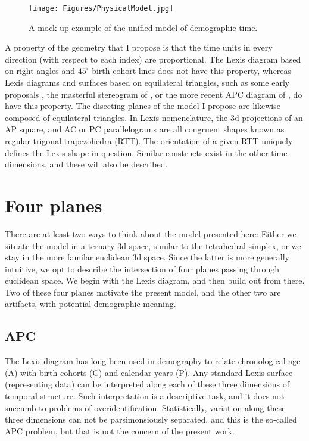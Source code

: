 \documentclass[onehalfspacing]{article}
\begin{document}
\begin{figure}[!h]
\centering
\caption[cap]{A mock-up example of the unified model of demographic
time.\footnotemark}
\label{fig:APCT}
	\texttt{[image: Figures/PhysicalModel.jpg]}
\end{figure}

A property of the geometry that I propose is that
the time units in every direction (with respect to each index) are proportional. The Lexis
diagram based on right angles and $45^\circ$ birth cohort lines does not have
this property, whereas Lexis diagrams and surfaces based on equilateral
triangles, such as some early proposals \citep[inter
alia, ][]{lexis1875einleitung, lewin1876rapport}, the masterful stereogram of
\citet{perozzo1880della}, or the more recent APC diagram
of \citet{ryder1980cohort}, do have this property. The disecting planes of the
model I propose are likewise composed of equilateral triangles. In Lexis
nomenclature, the 3d projections of an AP square, and AC or PC
parallelograms are all congruent shapes known as regular trigonal trapezohedra
(RTT). The orientation
of a given RTT uniquely defines the Lexis shape in question. Similar constructs
exist in the other time dimensions, and these will also be described. 

\section*{Four planes}

There are at least two ways to think about the model presented here: Either we
situate the model in a ternary 3d space, similar to the tetrahedral simplex, or
we stay in the more familar euclidean 3d space. Since the latter is more
generally intuitive, we opt to describe the intersection of four planes passing
through euclidean space. We begin with the Lexis diagram, and then build out
from there. Two of these four planes motivate the present model, and the other
two are artifacts, with potential demographic meaning.

\subsection{APC}
The Lexis diagram has long been used in demography to relate chronological age
(A) with birth cohorts (C) and calendar years (P). Any standard Lexis surface
(representing data) can be interpreted along each of these three dimensions of
temporal structure. Such interpretation is a descriptive task, and it does
not succumb to problems of overidentification. Statistically,
variation along these three dimensions can not be parsimonsiously separated, and
this is the so-called APC problem, but that is not the concern of the present work.







   
\end{document}
